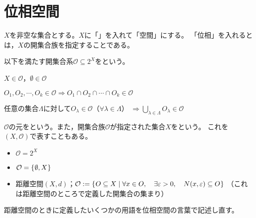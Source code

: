 \documentclass[uplatex]{jsarticle}
\renewcommand{\thepart}{\arabic{part}}
\begin{document}
  \fi
\renewcommand{\thesubsection}{\thepart.\arabic{section}.\arabic{subsection}}
  
\section{位相空間}


$X$を非空な集合とする。$X$に「」を入れて「空間」にする。
「位相」を入れるとは，$X$の開集合族を指定することである。

\begin{teigi}[位相]
  以下を満たす開集合系$\mathcal{O} \subseteq 2^{X}$をという。

   $X \in \mathcal{O}$，$\emptyset \in \mathcal{O}$

   $O_{1}, O_{2}, \cdots, O_{k} \in \mathcal{O} \Longrightarrow O_{1} \cap O_{2} \cap \cdots \cap O_{k} \in \mathcal{O}$

   任意の集合$\Lambda$に対して$O_{\lambda} \in \mathcal{O}$（$\forall \lambda \in \Lambda$） ${\displaystyle \Longrightarrow \bigcup_{\lambda \in \Lambda} O_{\lambda} \in \mathcal{O}}$

  $\mathcal{O}$の元をという。また，開集合族$\mathcal{O}$が指定された集合$X$をという。
  これを$(X,\mathcal{O})$で表すこともある。
\end{teigi}

\begin{rei}
  \begin{itemize}
    \item {} $\mathcal{O} = 2^{X}$
    \item {} $\mathcal{O} = \Set{\hspace{-1.8pt} \emptyset, X \hspace{-1.8pt}}$
    \item 距離空間$(X,d)$；$\mathcal{O} := \Set{\hspace{-1.8pt} O \subseteq X | \forall x \in O, \quad \exists \varepsilon > 0, \quad N(x, \varepsilon) \subseteq O \hspace{-1.8pt}}$
    （これは距離空間のところで定義した開集合の集まり）
  \end{itemize}
\end{rei}

距離空間のときに定義したいくつかの用語を位相空間の言葉で記述し直す。
\end{document}
